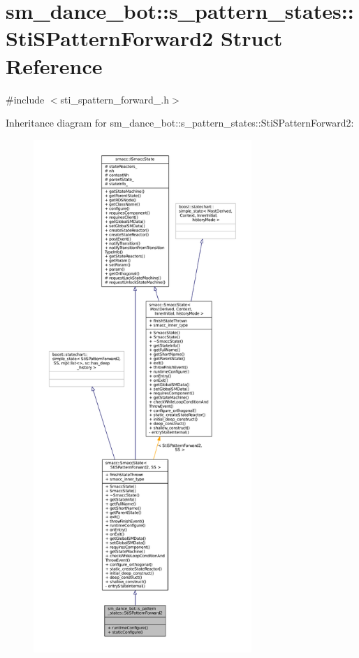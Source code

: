 \hypertarget{structsm__dance__bot_1_1s__pattern__states_1_1StiSPatternForward2}{}\section{sm\+\_\+dance\+\_\+bot\+:\+:s\+\_\+pattern\+\_\+states\+:\+:Sti\+S\+Pattern\+Forward2 Struct Reference}
\label{structsm__dance__bot_1_1s__pattern__states_1_1StiSPatternForward2}


{\ttfamily \#include $<$sti\+\_\+spattern\+\_\+forward\+\_.\+h$>$}



Inheritance diagram for sm\+\_\+dance\+\_\+bot\+:\+:s\+\_\+pattern\+\_\+states\+:\+:Sti\+S\+Pattern\+Forward2\+:
\nopagebreak
\begin{figure}[H]
\begin{center}
\leavevmode
\includegraphics[height=550pt]{structsm__dance__bot_1_1s__pattern__states_1_1StiSPatternForward2__inherit__graph}
\end{center}
\end{figure}


